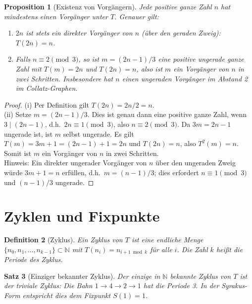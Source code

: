 \documentclass[12pt,a4paper]{article}
\newtheorem{theorem}{Satz}[section]
\newtheorem{proposition}[theorem]{Proposition}
\newtheorem{definition}[theorem]{Definition}
\begin{document}
\begin{proposition}[Existenz von Vorgängern]\label{prop:pred}
Jede positive ganze Zahl $n$ hat mindestens einen Vorgänger unter $T$. Genauer gilt:
\begin{enumerate}
  \item[(i)] $2n$ ist stets ein direkter Vorgänger von $n$ (über den geraden Zweig): $T(2n) = n$.
  \item[(ii)] Falls $n \equiv 2 \pmod{3}$, so ist $m = (2n-1)/3$ eine positive ungerade
              ganze Zahl mit $T(m) = 2n$ und $T(2n) = n$, also ist $m$ ein Vorgänger
              von $n$ in zwei Schritten. Insbesondere hat $n$ einen ungeraden Vorgänger
              im Abstand 2 im Collatz-Graphen.
\end{enumerate}
\end{proposition}

\begin{proof}
(i) Per Definition gilt $T(2n) = 2n/2 = n$.\\
(ii) Setze $m = (2n-1)/3$. Dies ist genau dann eine positive ganze Zahl, wenn
$3 \mid (2n-1)$, d.h.\ $2n \equiv 1 \pmod{3}$, also $n \equiv 2 \pmod{3}$.
Da $3m = 2n-1$ ungerade ist, ist $m$ selbst ungerade. Es gilt
$T(m) = 3m + 1 = (2n-1) + 1 = 2n$ und $T(2n) = n$, also $T^2(m) = n$.
Somit ist $m$ ein Vorgänger von $n$ in zwei Schritten.\\
Hinweis: Ein direkter ungerader Vorgänger von $n$ über den ungeraden Zweig
würde $3m + 1 = n$ erfüllen, d.h.\ $m = (n-1)/3$; dies erfordert $n \equiv 1 \pmod{3}$
und $(n-1)/3$ ungerade.
\end{proof}

\section{Zyklen und Fixpunkte}

\begin{definition}[Zyklus]\label{def:cycle}
Ein \emph{Zyklus} von $T$ ist eine endliche Menge $\{n_0, n_1, \ldots, n_{k-1}\} \subset \mathbb{N}$
mit $T(n_i) = n_{i+1 \bmod k}$ für alle $i$. Die Zahl $k$ heißt die \emph{Periode}
des Zyklus.
\end{definition}

\begin{theorem}[Einziger bekannter Zyklus]\label{thm:cycle}
Der einzige in $\mathbb{N}$ bekannte Zyklus von $T$ ist der \emph{triviale Zyklus}:
Die Bahn $1 \to 4 \to 2 \to 1$ hat die Periode 3. In der Syrakus-Form entspricht dies
dem Fixpunkt $S(1) = 1$.
\end{theorem}
\end{document}
